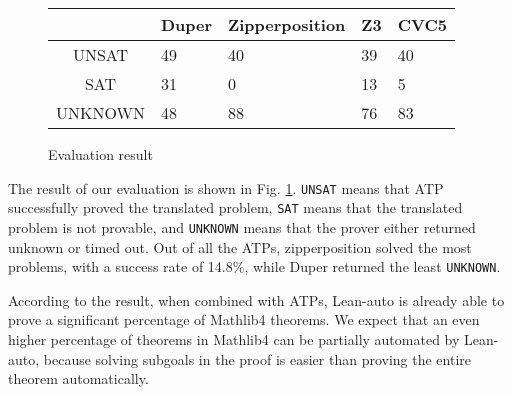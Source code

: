   \begin{figure}
  \begin{center}\begin{tabular}{| c K{6em} K{6em} K{6em} K{6em} |}
    \hline
            & Duper & Zipperposition & Z3 & CVC5 \\ \hline
    UNSAT   & 49    & 40             & 39 & 40   \\
    SAT     & 31    & 0              & 13 & 5    \\
    UNKNOWN & 48    & 88             & 76 & 83   \\ \hline
  \end{tabular}\end{center}
  \caption{Evaluation result} \label{figevalresult}
  \end{figure}

  The result of our evaluation is shown in Fig. \ref{figevalresult}. \texttt{UNSAT} means
  that ATP successfully proved the translated problem, \texttt{SAT} means that
  the translated problem is not provable, and \texttt{UNKNOWN} means that the prover
  either returned unknown or timed out. Out of all the ATPs, zipperposition solved the
  most problems, with a success rate of 14.8\%, while Duper returned the least \texttt{UNKNOWN}.
  
  According to the result, when combined with ATPs, Lean-auto is already able to
  prove a significant percentage of Mathlib4 theorems. We expect that an even higher percentage
  of theorems in Mathlib4 can be partially automated by Lean-auto, because solving
  subgoals in the proof is easier than proving the entire theorem automatically.